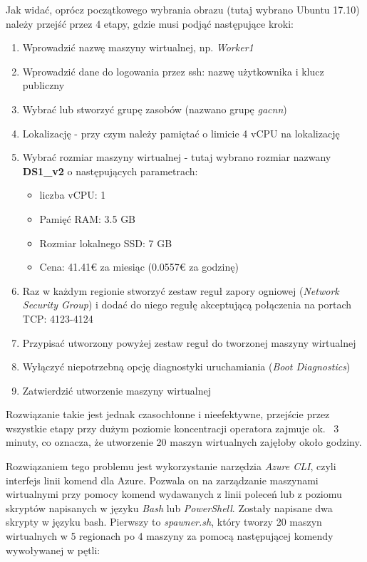 Jak widać, oprócz początkowego wybrania obrazu (tutaj wybrano Ubuntu 17.10) należy przejść przez 4 etapy, gdzie musi podjąć następujące kroki:
\begin{enumerate}
  \item Wprowadzić nazwę maszyny wirtualnej, np. \textit{Worker1}
  \item Wprowadzić dane do logowania przez ssh: nazwę użytkownika i klucz publiczny
  \item Wybrać lub stworzyć grupę zasobów (nazwano grupę \textit{gacnn})
  \item Lokalizację - przy czym należy pamiętać o limicie 4 vCPU na lokalizację
  \item Wybrać rozmiar maszyny wirtualnej - tutaj wybrano rozmiar nazwany \textbf{DS1\_v2} o następujących parametrach:
  \begin{itemize}
    \item liczba vCPU: 1
    \item Pamięć RAM: 3.5 GB
    \item Rozmiar lokalnego SSD: 7 GB
    \item Cena: 41.41€ za miesiąc (0.0557€ za godzinę)
  \end{itemize}
  \item Raz w każdym regionie stworzyć zestaw reguł zapory ogniowej (\textit{Network Security Group}) i dodać do niego regułę akceptującą połączenia na portach TCP: 4123-4124
  \item Przypisać utworzony powyżej zestaw reguł do tworzonej maszyny wirtualnej
  \item Wyłączyć niepotrzebną opcję diagnostyki uruchamiania (\textit{Boot Diagnostics})
  \item Zatwierdzić utworzenie maszyny wirtualnej
\end{enumerate}
Rozwiązanie takie jest jednak czasochłonne i nieefektywne, przejście przez wszystkie etapy przy dużym poziomie koncentracji operatora zajmuje ok. ~3 minuty, co oznacza, że utworzenie 20 maszyn wirtualnych zajęłoby około godziny.

Rozwiązaniem tego problemu jest wykorzystanie narzędzia \textit{Azure CLI}, czyli interfejs linii komend dla Azure.
Pozwala on na zarządzanie maszynami wirtualnymi przy pomocy komend wydawanych z linii poleceń lub z poziomu skryptów napisanych w języku \textit{Bash} lub \textit{PowerShell}.
Zostały napisane dwa skrypty w języku bash.
Pierwszy to \textit{spawner.sh}, który tworzy 20 maszyn wirtualnych w 5 regionach po 4 maszyny za pomocą następującej komendy wywoływanej w pętli:\\

